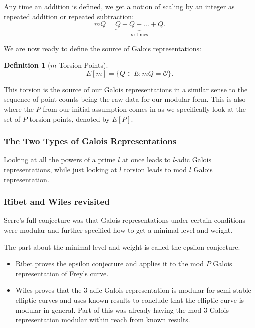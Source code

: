 \documentclass{article}
\theoremstyle{definition}
\theoremstyle{definition}
\newtheorem{defn}{Definition}[section]
\theoremstyle{definition}
\begin{document}


Any time an addition is defined, we get a notion of scaling by an integer as repeated addition or repeated subtraction:
$$mQ=\underbrace{Q+Q+\dots+Q}_{m\text{ times}}.$$

We are now ready to define the source of Galois representations:

\begin{defn}[$m$-Torsion Points]\label{torsionpt}
$$E[m]=\{Q\in E: m Q=\mathcal{O}\}.$$
\end{defn}


This torsion is the source of our Galois representations in a similar sense to the sequence of point counts being the raw data for our modular form. This is also where the $P$ from our initial assumption comes in as we specifically look at the set of $P$ torsion points, denoted by $E[P]$.

\subsubsection{The Two Types of Galois Representations}

Looking at all the powers of a prime $l$ at once leads to $l$-adic Galois representations, while just looking at $l$ torsion leads to mod $l$ Galois representation.

\subsubsection{Ribet and Wiles revisited}
 Serre's full conjecture was that Galois representations under certain conditions were modular and further specified how to get a minimal level and weight.

 The part about the minimal level and weight is called the epsilon conjecture.



\begin{itemize}
\item Ribet proves the epsilon conjecture and applies it to the mod $P$ Galois representation of Frey's curve.

\item Wiles proves that the $3$-adic Galois representation is modular for semi stable elliptic curves and uses known results to conclude that the elliptic curve is modular in general. Part of this was already having the mod $3$ Galois representation modular within reach from known results.
\end{itemize}
\end{document}
